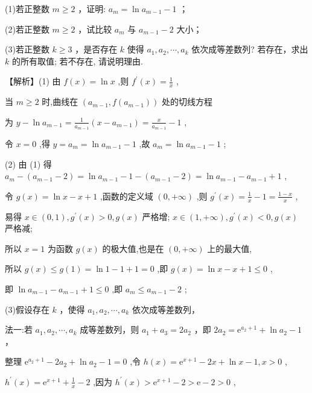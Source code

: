 \documentclass[10pt]{article}
\begin{document}
(1)若正整数 \(m \geq  2\) ，证明: \({a}_{m} = \ln {a}_{m - 1} - 1\) ；

(2)若正整数 \(m \geq  2\) ，试比较 \({a}_{m}\) 与 \({a}_{m - 1} - 2\) 大小；

(3)若正整数 \(k \geq  3\) ，是否存在 \(k\) 使得 \({a}_{1},{a}_{2},\cdots ,{a}_{k}\) 依次成等差数列? 若存在，求出 \(k\) 的所有取值; 若不存在, 请说明理由.

【解析】(1) 由 \(f\left( x\right)  = \ln x\) ,则 \({f}^{\prime }\left( x\right)  = \frac{1}{x}\) ,

当 \(m \geq  2\) 时,曲线在 \(\left( {{a}_{m - 1},f\left( {a}_{m - 1}\right) }\right)\) 处的切线方程

为 \(y - \ln {a}_{m - 1} = \frac{1}{{a}_{m - 1}}\left( {x - {a}_{m - 1}}\right)  = \frac{x}{{a}_{m - 1}} - 1\) ,

令 \(x = 0\) ,得 \(y = {a}_{m} = \ln {a}_{m - 1} - 1\) ,故 \({a}_{m} = \ln {a}_{m - 1} - 1\) ;

(2) 由 (1) 得 \({a}_{m} - \left( {{a}_{m - 1} - 2}\right)  = \ln {a}_{m - 1} - 1 - \left( {{a}_{m - 1} - 2}\right)  = \ln {a}_{m - 1} - {a}_{m - 1} + 1\) ,

令 \(g\left( x\right)  = \ln x - x + 1\) ,函数的定义域 \(\left( {0, + \infty }\right)\) ,则 \({g}^{\prime }\left( x\right)  = \frac{1}{x} - 1 = \frac{1 - x}{x}\) ,

易得 \(x \in  \left( {0,1}\right) ,{g}^{\prime }\left( x\right)  > 0,g\left( x\right)\) 严格增; \(x \in  \left( {1, + \infty }\right) ,{g}^{\prime }\left( x\right)  < 0,g\left( x\right)\) 严格减;

所以 \(x = 1\) 为函数 \(g\left( x\right)\) 的极大值,也是在 \(\left( {0, + \infty }\right)\) 上的最大值,

所以 \(g\left( x\right)  \leq  g\left( 1\right)  = \ln 1 - 1 + 1 = 0\) ,即 \(g\left( x\right)  = \ln x - x + 1 \leq  0\) ,

即 \(\ln {a}_{m - 1} - {a}_{m - 1} + 1 \leq  0\) ,即 \({a}_{m} \leq  {a}_{m - 1} - 2\) ;

(3)假设存在 \(k\) ，使得 \({a}_{1},{a}_{2},\cdots ,{a}_{k}\) 依次成等差数列，

法一:若 \({a}_{1},{a}_{2},\cdots ,{a}_{k}\) 成等差数列，则 \({a}_{1} + {a}_{3} = 2{a}_{2}\) ，即 \(2{a}_{2} = {\mathrm{e}}^{{a}_{2} + 1} + \ln {a}_{2} - 1\) ，

整理 \({\mathrm{e}}^{{a}_{2} + 1} - 2{a}_{2} + \ln {a}_{2} - 1 = 0\) ,令 \(h\left( x\right)  = {\mathrm{e}}^{x + 1} - {2x} + \ln x - 1,x > 0\) ,

\({h}^{\prime }\left( x\right)  = {\mathrm{e}}^{x + 1} + \frac{1}{x} - 2\) ,因为 \({h}^{\prime }\left( x\right)  > {\mathrm{e}}^{x + 1} - 2 > \mathrm{e} - 2 > 0\) ,
\end{document}

